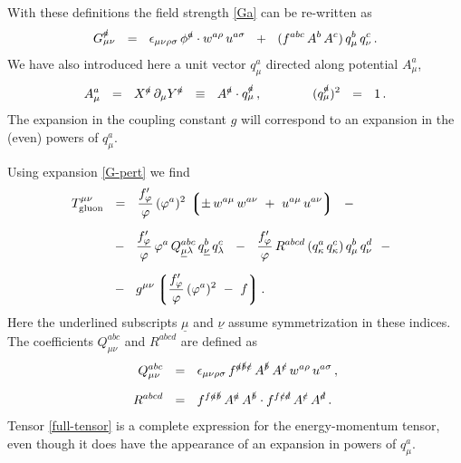 \documentclass[epsfig,12pt]{article}
\def\beq{\begin{equation}}
\def\eeq{\end{equation}}
\newcommand{\p}{\partial}
\newcommand{\lgr}{\left\lgroup}
\newcommand{\rgr}{\right\rgroup}
\begin{document}
	With these definitions the field strength \eqref{Ga} can be re-written as
\beq
\label{G-pert}
	G_{\mu\nu}^\slashed a    ~~=~~    \epsilon_{\mu\nu\rho\sigma}\, \phi^\slashed{a} \cdot w^{a\rho}\, u^{a\sigma}
				 ~~+~~  ( f^{abc}\, A^b\, A^c )\, q_\mu^b\, q_\nu^c\,.
\eeq
	We have also introduced here a unit vector $ q^a_\mu $ directed along potential $ A_\mu^a $,
\beq
	A_\mu^a    ~~=~~    X^\slashed a\, \p_\mu Y^\slashed a    ~~\equiv~~    A^\slashed a \cdot q_\mu^\slashed a\,,
	\qquad\qquad
	( q_\mu^\slashed a )^2    ~~=~~    1\,.
\eeq
	The expansion in the coupling constant $ g $ will correspond to an expansion in the (even) powers of $ q_\mu^a $.

	Using expansion \eqref{G-pert} we find
\begin{align}
%
\notag
	T_\text{gluon}^{\mu\nu}    & ~~=~~    \frac{f^\prime_\varphi}{\varphi}\, (\varphi^a)^2\,
					      \lgr \pm\, w^{a\mu}\, w^{a\nu}  ~+~  u^{a\mu}\, u^{a\nu} \rgr    ~~-~~
	\\[2mm]
%
\label{full-tensor}
				   & ~~-~~  \frac{f^\prime_\varphi}{\varphi}\, \varphi^a\,
					    Q^{abc}_{\underline{\mu}\lambda}\, q^b_{\underline{\nu}}\, q^c_\lambda
				     ~~-~~  \frac{f^\prime_\varphi}{\varphi}\,
					    R^{abcd}\, ( q^a_\kappa\, q^c_\kappa )\, q^b_\mu\, q^d_\nu    ~~-~~
	\\[2mm]
%
\notag
				   & ~~-~~  g^{\mu\nu}
					    \lgr \frac{f^\prime_\varphi}{\varphi}\, (\varphi^a)^2  ~-~  f \rgr .
\end{align}
	Here the underlined subscripts $ \underline{\mu} $ and $ \underline{\nu} $ assume symmetrization
	in these indices.
	The coefficients $ Q^{abc}_{\mu\nu} $ and $ R^{abcd} $ are defined as
\begin{align*}
%
	Q^{abc}_{\mu\nu}    & ~~=~~    \epsilon_{\mu\nu\rho\sigma}\,
				       f^{\slashed a\slashed b\slashed c}\, A^\slashed{b}\, A^\slashed{c}\,
				       w^{a\rho}\, u^{a\sigma}\,,
	\\[2mm]
%
	R^{abcd}    & ~~=~~    f^{f\slashed a\slashed b}\, A^\slashed{a}\, A^\slashed{b} \cdot
			       f^{f\slashed c\slashed d}\, A^\slashed{c}\, A^\slashed{d}\,.
\end{align*}
	Tensor \eqref{full-tensor} is a complete expression for the energy-momentum tensor,
	even though it does have the appearance of an expansion in powers of $ q^a_\mu $.
\end{document}
